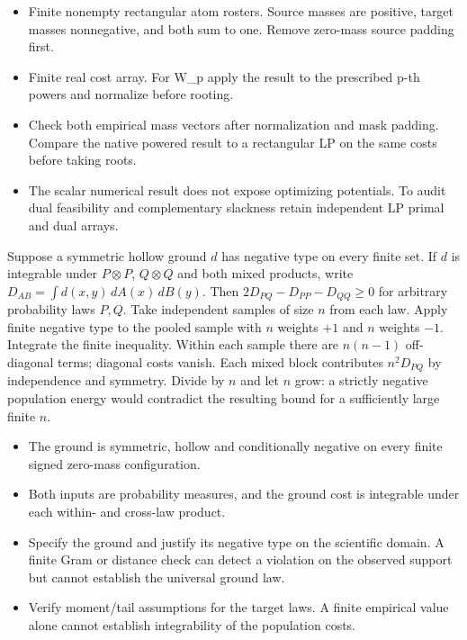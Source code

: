 \expandafter\def\csname statadic@assumptions@STATADIC-TRANSPORT-005\endcsname{\begin{itemize}
\item Finite nonempty rectangular atom rosters. Source masses are positive, target masses nonnegative, and both sum to one. Remove zero-mass source padding first.
\item Finite real cost array. For W\_p apply the result to the prescribed p-th powers and normalize before rooting.
\end{itemize}}
\expandafter\def\csname statadic@diagnostics@STATADIC-TRANSPORT-005\endcsname{\begin{itemize}
\item Check both empirical mass vectors after normalization and mask padding. Compare the native powered result to a rectangular LP on the same costs before taking roots.
\item The scalar numerical result does not expose optimizing potentials. To audit dual feasibility and complementary slackness retain independent LP primal and dual arrays.
\end{itemize}}
\expandafter\def\csname statadic@statement@STATADIC-ENERGY-006\endcsname{Suppose a symmetric hollow ground $d$ has negative type on every
  finite set. If $d$ is integrable under $P\otimes P$, $Q\otimes Q$ and both mixed
  products, write $D_{AB}=\int d(x,y)\,dA(x)\,dB(y)$. Then
  $2D_{PQ}-D_{PP}-D_{QQ}\ge0$ for arbitrary probability laws $P,Q$.}
\expandafter\def\csname statadic@proof@STATADIC-ENERGY-006\endcsname{Take independent samples of size $n$ from each law. Apply finite
  negative type to the pooled sample with $n$ weights $+1$ and $n$ weights $-1$.
  Integrate the finite inequality. Within each sample there are $n(n-1)$
  off-diagonal terms; diagonal costs vanish. Each mixed block contributes
  $n^2D_{PQ}$ by independence and symmetry. Divide by $n$ and let $n$ grow:
  a strictly negative population energy would contradict the resulting bound
  for a sufficiently large finite $n$.}
\expandafter\def\csname statadic@assumptions@STATADIC-ENERGY-006\endcsname{\begin{itemize}
\item The ground is symmetric, hollow and conditionally negative on every finite signed zero-mass configuration.
\item Both inputs are probability measures, and the ground cost is integrable under each within- and cross-law product.
\end{itemize}}
\expandafter\def\csname statadic@diagnostics@STATADIC-ENERGY-006\endcsname{\begin{itemize}
\item Specify the ground and justify its negative type on the scientific domain. A finite Gram or distance check can detect a violation on the observed support but cannot establish the universal ground law.
\item Verify moment/tail assumptions for the target laws. A finite empirical value alone cannot establish integrability of the population costs.
\end{itemize}}
